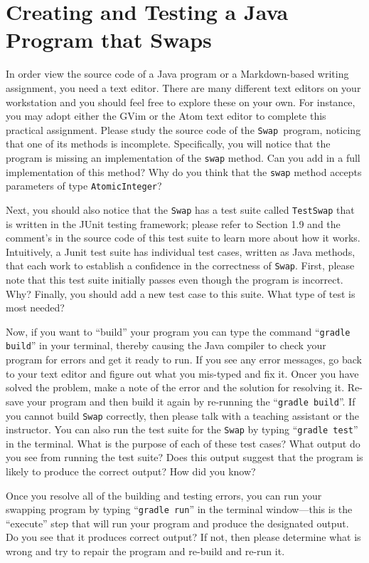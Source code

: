 \documentclass[11pt]{article}
\newcommand{\mainprogram}{\lstinline{Swap}}
\newcommand{\testprogram}{\lstinline{TestSwap}}
\newcommand{\gradlebuild}{\command{gradle build}}
\newcommand{\gradletest}{\command{gradle test}}
\newcommand{\gradlerun}{\command{gradle run}}
\newcommand{\command}[1]{``\lstinline{#1}''}
\newcommand{\program}[1]{\lstinline{#1}}
\newcommand{\step}[1]{``{#1}''}
\begin{document}
\section*{Creating and Testing a Java Program that Swaps}

In order view the source code of a Java program or a Markdown-based writing
assignment, you need a text editor. There are many different text editors on
your workstation and you should feel free to explore these on your own. For
instance, you may adopt either the GVim or the Atom text editor to complete this
practical assignment. Please study the source code of the \mainprogram~program,
noticing that one of its methods is incomplete. Specifically, you will notice
that the program is missing an implementation of the \program{swap} method. Can you
add in a full implementation of this method? Why do you think that the
\program{swap} method accepts parameters of type \program{AtomicInteger}?

Next, you should also notice that the \mainprogram{} has a test suite called
\testprogram{} that is written in the JUnit testing framework; please refer to
Section 1.9 and the comment's in the source code of this test suite to learn
more about how it works. Intuitively, a Junit test suite has individual test
cases, written as Java methods, that each work to establish a confidence in the
correctness of \mainprogram{}. First, please note that this test suite initially
passes even though the program is incorrect. Why? Finally, you should add a new
test case to this suite. What type of test is most needed?

Now, if you want to \step{build} your program you can type the command
\gradlebuild{} in your terminal, thereby causing the Java compiler to check your
program for errors and get it ready to run. If you see any error messages, go
back to your text editor and figure out what you mis-typed and fix it. Oncer you
have solved the problem, make a note of the error and the solution for resolving
it. Re-save your program and then build it again by re-running the
\gradlebuild{}. If you cannot build \mainprogram{} correctly, then please talk
with a teaching assistant or the instructor. You can also run the test suite for
the \mainprogram{} by typing \gradletest{} in the terminal. What is the purpose
of each of these test cases? What output do you see from running the test suite?
Does this output suggest that the program is likely to produce the correct
output? How did you know?

Once you resolve all of the building and testing errors, you can run your
swapping program by typing \gradlerun{} in the terminal window---this is the
``execute'' step that will run your program and produce the designated output.
Do you see that it produces correct output? If not, then please determine what
is wrong and try to repair the program and re-build and re-run it.
\end{document}
